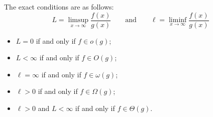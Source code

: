 \documentclass{article}
\theoremstyle{definition}
\theoremstyle{definition}
\theoremstyle{remark}
\begin{document}
The exact conditions are as follows:
\begin{equation*}
    L=\limsup_{x\rightarrow\infty}\frac{f(x)}{g(x)}\qquad\text{and}\qquad\ell=\liminf_{x\rightarrow\infty}\frac{f(x)}{g(x)}
\end{equation*}
\begin{itemize}
    \item $L=0$ if and only if $f\in o(g)$;
    \item $L<\infty$ if and only if $f\in O(g)$;
    \item $\ell=\infty$ if and only if $f\in\omega(g)$;
    \item $\ell>0$ if and only if $f\in\Omega(g)$;
    \item $\ell>0$ and $L<\infty$ if and only if $f\in\Theta(g)$.
\end{itemize}
\end{document}
